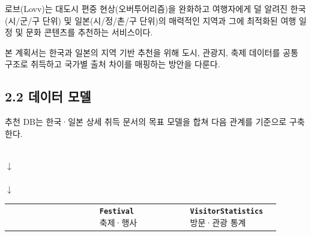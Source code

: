 \documentclass[12pt,a4paper]{article}
\newcommand{\DocNeedspace}[1]{\par\ifdim\dimexpr\pagegoal-\pagetotal\relax<#1\newpage\fi}
\begin{document}
\DocNeedspace{3\baselineskip}
로브(Lovv)는 대도시 편중 현상(오버투어리즘)을 완화하고 여행자에게 덜 알려진 한국(시/군/구 단위) 및 일본(시/정/촌/구 단위)의 매력적인 지역과 그에 최적화된 여행 일정 및 문화 콘텐츠를 추천하는 서비스이다.


\DocNeedspace{3\baselineskip}
본 계획서는 한국과 일본의 지역 기반 추천을 위해 도시, 관광지, 축제 데이터를 공통 구조로 취득하고 국가별 출처 차이를 매핑하는 방안을 다룬다.


\DocNeedspace{24\baselineskip}
\subsection*{2.2 데이터 모델}


\DocNeedspace{3\baselineskip}
추천 DB는 한국·일본 상세 취득 문서의 목표 모델을 합쳐 다음 관계를 기준으로 구축한다.


\DocNeedspace{7\baselineskip}
\begin{center}
\begin{small}
\setlength{\fboxsep}{6pt}
\\[-0.1em]
\textcolor{LovvGreen}{\Large$\downarrow$}\\[-0.2em]
\\[-0.1em]
\textcolor{LovvGreen}{\Large$\downarrow$}\\[-0.2em]
\begin{tabular}{@{}>{\centering\arraybackslash}m{0.30\linewidth}>{\centering\arraybackslash}m{0.30\linewidth}>{\centering\arraybackslash}m{0.30\linewidth}@{}}
\fcolorbox{LovvGreen}{white}{\parbox[c][2.8em][c]{0.25\textwidth}{\centering\textbf{\texttt{Attraction}}\\[-0.1em]{\footnotesize 관광지}}} &
\fcolorbox{LovvGreen}{white}{\parbox[c][2.8em][c]{0.25\textwidth}{\centering\textbf{\texttt{Festival}}\\[-0.1em]{\footnotesize 축제·행사}}} &
\fcolorbox{LovvGreen}{white}{\parbox[c][2.8em][c]{0.25\textwidth}{\centering\textbf{\texttt{VisitorStatistics}}\\[-0.1em]{\footnotesize 방문·관광 통계}}}
\end{tabular}
\end{small}
\end{center}
\end{document}
